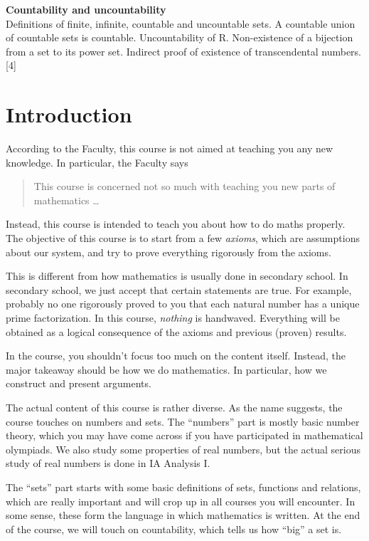 \documentclass[a4paper]{article}
\begin{document}
{  \vspace{10pt}
  \noindent\textbf{Countability and uncountability}\\
  Definitions of finite, infinite, countable and uncountable sets. A countable union of countable sets is countable. Uncountability of R. Non-existence of a bijection from a set to its power set. Indirect proof of existence of transcendental numbers.\hspace*{\fill}[4]}

\tableofcontents

\setcounter{section}{-1}
\section{Introduction}
According to the Faculty, this course is not aimed at teaching you any new knowledge. In particular, the Faculty says
\begin{quote}
  This course is concerned not so much with teaching you new parts of mathematics \ldots
\end{quote}
Instead, this course is intended to teach you about how to do maths properly. The objective of this course is to start from a few \emph{axioms}, which are assumptions about our system, and try to prove everything rigorously from the axioms.

This is different from how mathematics is usually done in secondary school. In secondary school, we just accept that certain statements are true. For example, probably no one rigorously proved to you that each natural number has a unique prime factorization. In this course, \emph{nothing} is handwaved. Everything will be obtained as a logical consequence of the axioms and previous (proven) results.

In the course, you shouldn't focus too much on the content itself. Instead, the major takeaway should be how we do mathematics. In particular, how we construct and present arguments.

The actual content of this course is rather diverse. As the name suggests, the course touches on numbers and sets. The ``numbers'' part is mostly basic number theory, which you may have come across if you have participated in mathematical olympiads. We also study some properties of real numbers, but the actual serious study of real numbers is done in IA Analysis I.

The ``sets'' part starts with some basic definitions of sets, functions and relations, which are really important and will crop up in all courses you will encounter. In some sense, these form the language in which mathematics is written. At the end of the course, we will touch on countability, which tells us how ``big'' a set is.
\end{document}
